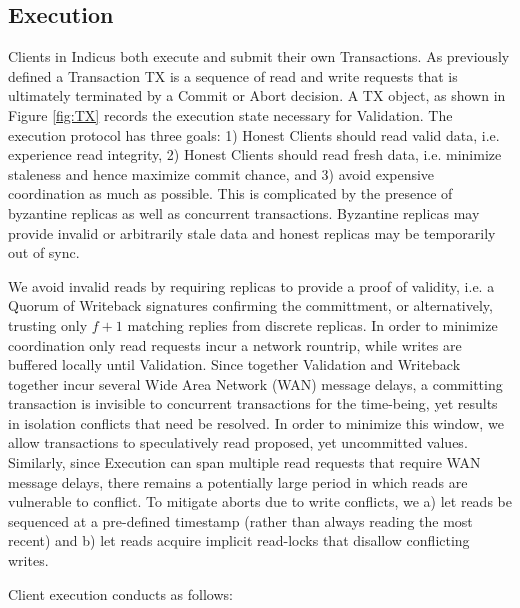 \subsection{Execution}
Clients in Indicus both execute and submit their own Transactions. As previously defined a Transaction TX is a sequence of read and write requests that is ultimately terminated by a Commit or Abort decision. A TX object, as shown in Figure \ref{fig:TX} records the execution state necessary for Validation. The execution protocol has three goals: 1) Honest Clients should read valid data, i.e. experience read integrity, 2) Honest Clients should read fresh data, i.e. minimize staleness and hence maximize commit chance, and 3) avoid expensive coordination as much as possible. This is complicated by the presence of byzantine replicas as well as concurrent transactions. Byzantine replicas may provide invalid or arbitrarily stale data and honest replicas may be temporarily out of sync.

We avoid invalid reads by requiring replicas to provide a proof of validity, i.e. a Quorum of Writeback signatures confirming the committment, or alternatively, trusting only $f+1$ matching replies from discrete replicas. In order to minimize coordination only read requests incur a network rountrip, while writes are buffered locally until Validation. 
Since together Validation and Writeback together incur several Wide Area Network (WAN) message delays, a committing transaction is invisible to concurrent transactions for the time-being, yet results in isolation conflicts that need be resolved. In order to minimize this window, we allow transactions to speculatively read proposed, yet uncommitted values. Similarly, since Execution can span multiple read requests that require WAN message delays, there remains a potentially large period in which reads are vulnerable to conflict. To mitigate aborts due to write conflicts, we a) let reads be sequenced at a pre-defined timestamp (rather than always reading the most recent) and b) let reads acquire implicit read-locks that disallow conflicting writes. 




Client execution conducts as follows:

